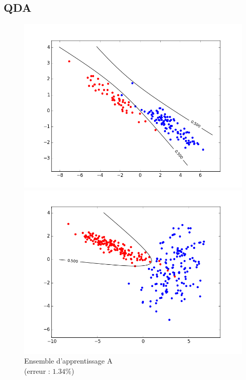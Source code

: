 \documentclass[paper=a4, fontsize=11pt]{article}
\begin{document}
\subsection*{QDA}
\begin{figure}[h]
 \begin{minipage}[b]{.3\linewidth}
 \begin{center}
 \includegraphics[scale=0.25]{figures/QDA_A_train.png}
  \caption*{Ensemble d'apprentissage A \\ (erreur : $1.34\%$)}
 \end{center}
 \end{minipage} \hfill
 \begin{minipage}[b]{.3\linewidth}
  \includegraphics[scale=0.25]{figures/QDA_B_train.png}

\end{minipage}
\end{figure}
\end{document}
